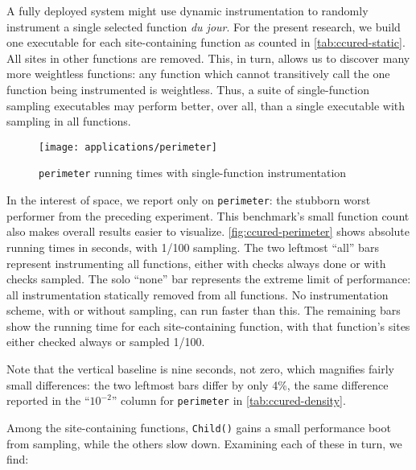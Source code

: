 A fully deployed system might use dynamic instrumentation to randomly
instrument a single selected function \textit{du jour}.  For the
present research, we build one executable for each site-containing
function as counted in \autoref{tab:ccured-static}.  All sites in
other functions are removed.  This, in turn, allows us to discover
many more weightless functions: any function which cannot transitively
call the one function being instrumented is weightless.  Thus, a suite
of single-function sampling executables may perform better, over all,
than a single executable with sampling in all functions.

\begin{figure}
  \centering
  \texttt{[image: applications/perimeter]}
  \caption{\texttt{perimeter} running times with single-function
    instrumentation}
  \label{fig:ccured-perimeter}
\end{figure}

In the interest of space, we report only on \texttt{perimeter}: the
stubborn worst performer from the preceding experiment.  This
benchmark's small function count also makes overall results easier to
visualize.  \autoref{fig:ccured-perimeter} shows absolute running
times in seconds, with 1/100 sampling.  The two leftmost ``all'' bars
represent instrumenting all functions, either with checks always done
or with checks sampled.  The solo ``none'' bar represents the extreme
limit of performance: all instrumentation statically removed from all
functions.  No instrumentation scheme, with or without sampling, can
run faster than this.  The remaining bars show the running time for
each site-containing function, with that function's sites either
checked always or sampled 1/100.

Note that the vertical baseline is nine seconds, not zero, which
magnifies fairly small differences: the two leftmost bars differ by
only 4\%, the same difference reported in the ``$10^{-2}$'' column for
\texttt{perimeter} in \autoref{tab:ccured-density}.

Among the site-containing functions, \texttt{Child()} gains a small
performance boot from sampling, while the others slow down.  Examining
each of these in turn, we find:

